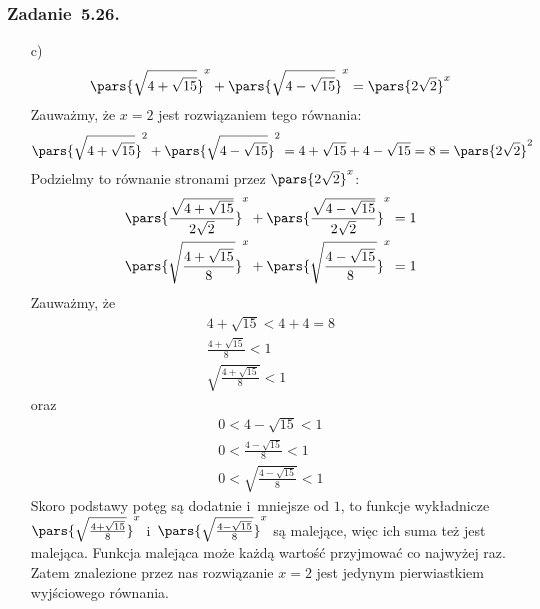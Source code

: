 \subsubsection*{Zadanie~5.26.}
\begin{itemize}
    \item[c)]
        \begin{equation*}
            \pars{\sqrt{4 + \sqrt{15}}}^x + \pars{\sqrt{4 - \sqrt{15}}}^x = \pars{2\sqrt{2}}^x
        \end{equation*}
        Zauważmy, że \(x = 2\) jest rozwiązaniem tego równania:
        \begin{equation*}
            \pars{\sqrt{4 + \sqrt{15}}}^2 + \pars{\sqrt{4 - \sqrt{15}}}^2
                = 4 + \sqrt{15} + 4 - \sqrt{15}
                = 8
                = \pars{2\sqrt{2}}^2
        \end{equation*}
        Podzielmy to równanie stronami przez \(\pars{2\sqrt{2}}^x\):
        \begin{gather*}
            \pars{\frac{\sqrt{4 + \sqrt{15}}}{2\sqrt{2}}}^x + \pars{\frac{\sqrt{4 - \sqrt{15}}}{2\sqrt{2}}}^x = 1\\
            \pars{\sqrt{\frac{4 + \sqrt{15}}{8}}}^x + \pars{\sqrt{\frac{4 - \sqrt{15}}{8}}}^x = 1
        \end{gather*}
        Zauważmy, że
        \begin{gather*}
            4 + \sqrt{15} < 4 + 4 = 8\\
            \frac{4 + \sqrt{15}}{8} < 1\\
            \sqrt{\frac{4 + \sqrt{15}}{8}} < 1
        \end{gather*}
        oraz
        \begin{gather*}
            0 < 4 - \sqrt{15} < 1\\
            0 < \frac{4 - \sqrt{15}}{8} < 1\\
            0 < \sqrt{\frac{4 - \sqrt{15}}{8}} < 1
        \end{gather*}
        Skoro podstawy potęg są dodatnie i~mniejsze od \(1\), to funkcje wykładnicze \(\pars{\sqrt{\frac{4 + \sqrt{15}}{8}}}^x\) i~\(\pars{\sqrt{\frac{4 - \sqrt{15}}{8}}}^x\) są malejące, więc ich suma też jest malejąca. Funkcja malejąca może każdą wartość przyjmować co najwyżej raz. Zatem znalezione przez nas rozwiązanie \(x = 2\) jest jedynym pierwiastkiem wyjściowego równania.
\end{itemize}
